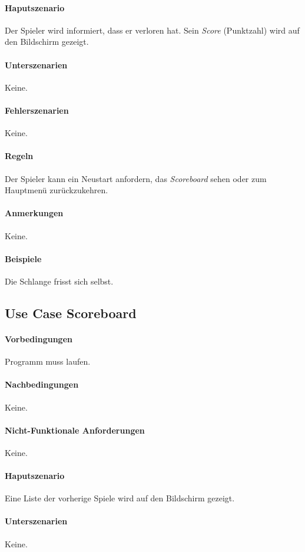 \documentclass[a4paper, twosided, 11pt]{scrartcl}
\begin{document}
\paragraph{Haputszenario} Der Spieler wird informiert, dass er verloren hat.
Sein \emph{Score} (Punktzahl) wird auf den Bildschirm gezeigt.
\paragraph{Unterszenarien} Keine.
\paragraph{Fehlerszenarien} Keine.
\paragraph{Regeln} Der Spieler kann ein Neustart anfordern, das
\emph{Scoreboard} sehen oder zum Hauptmenü zurückzukehren.
\paragraph{Anmerkungen} Keine.
\paragraph{Beispiele} Die Schlange frisst sich selbst.

\subsection{Use Case Scoreboard}
\paragraph{Vorbedingungen} Programm muss laufen.
\paragraph{Nachbedingungen} Keine.
\paragraph{Nicht-Funktionale Anforderungen} Keine.
\paragraph{Haputszenario} Eine Liste der vorherige Spiele wird auf den
Bildschirm gezeigt.
\paragraph{Unterszenarien} Keine.
\end{document}
